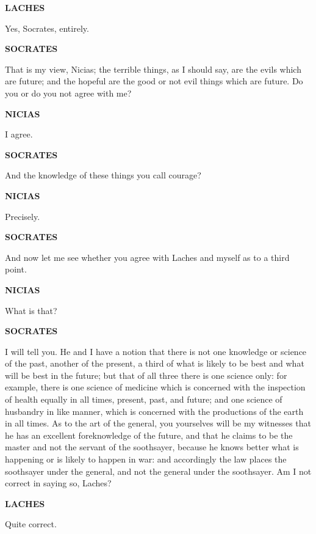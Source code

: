 \documentclass[11pt,letter]{article}
\begin{document}
\par \textbf{LACHES}
\par   Yes, Socrates, entirely.

\par \textbf{SOCRATES}
\par   That is my view, Nicias; the terrible things, as I should say, are the evils which are future; and the hopeful are the good or not evil things which are future. Do you or do you not agree with me?

\par \textbf{NICIAS}
\par   I agree.

\par \textbf{SOCRATES}
\par   And the knowledge of these things you call courage?

\par \textbf{NICIAS}
\par   Precisely.

\par \textbf{SOCRATES}
\par   And now let me see whether you agree with Laches and myself as to a third point.

\par \textbf{NICIAS}
\par   What is that?

\par \textbf{SOCRATES}
\par   I will tell you. He and I have a notion that there is not one knowledge or science of the past, another of the present, a third of what is likely to be best and what will be best in the future; but that of all three there is one science only:  for example, there is one science of medicine which is concerned with the inspection of health equally in all times, present, past, and future; and one science of husbandry in like manner, which is concerned with the productions of the earth in all times. As to the art of the general, you yourselves will be my witnesses that he has an excellent foreknowledge of the future, and that he claims to be the master and not the servant of the soothsayer, because he knows better what is happening or is likely to happen in war:  and accordingly the law places the soothsayer under the general, and not the general under the soothsayer. Am I not correct in saying so, Laches?

\par \textbf{LACHES}
\par   Quite correct.
\end{document}
